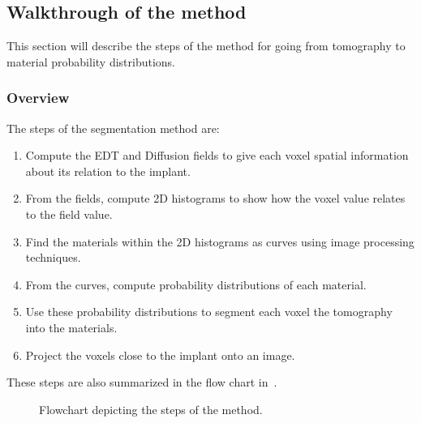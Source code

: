 
\subsection{Walkthrough of the method}
This section will describe the steps of the method for going from tomography to material probability distributions.

\subsubsection{Overview}
The steps of the segmentation method are:
\begin{enumerate}
    \item Compute the EDT and Diffusion fields to give each voxel spatial information about its relation to the implant.
    \item From the fields, compute 2D histograms to show how the voxel value relates to the field value.
    \item Find the materials within the 2D histograms as curves using image processing techniques.
    \item From the curves, compute probability distributions of each material.
    \item Use these probability distributions to segment each voxel the tomography into the materials.
    \item Project the voxels close to the implant onto an image.
\end{enumerate}
These steps are also summarized in the flow chart in~.

\begin{figure}
    \centering
    \caption{Flowchart depicting the steps of the method.
    }
    \label{fig:flowchart}
\end{figure}

